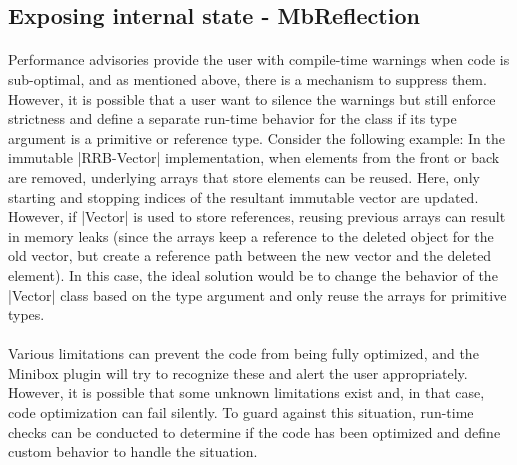 \subsection{Exposing internal state - MbReflection}
\paragraph{}
Performance advisories provide the user with compile-time warnings when code is sub-optimal, and as mentioned above, there is a mechanism to suppress them. However, it is possible that a user want to silence the warnings but still enforce strictness and define a separate run-time behavior for the class if its type argument is a primitive or reference type. Consider the following example: In the immutable |RRB-Vector| implementation, when elements from the front or back are removed, underlying arrays that store elements can be reused. Here, only starting and stopping indices of the resultant immutable vector are updated. However, if |Vector| is used to store references, reusing previous arrays can result in memory leaks (since the arrays keep a reference to the deleted object for the old vector, but create a reference path between the new vector and the deleted element). In this case, the ideal solution would be to change the behavior of the |Vector| class based on the type argument and only reuse the arrays for primitive types.

\paragraph{}
Various limitations can prevent the code from being fully optimized, and the Minibox plugin will try to recognize these and alert the user appropriately. However, it is possible that some unknown limitations exist and, in that case, code optimization can fail silently. To guard against this situation, run-time checks can be conducted to determine if the code has been optimized and define custom behavior to handle the situation.

